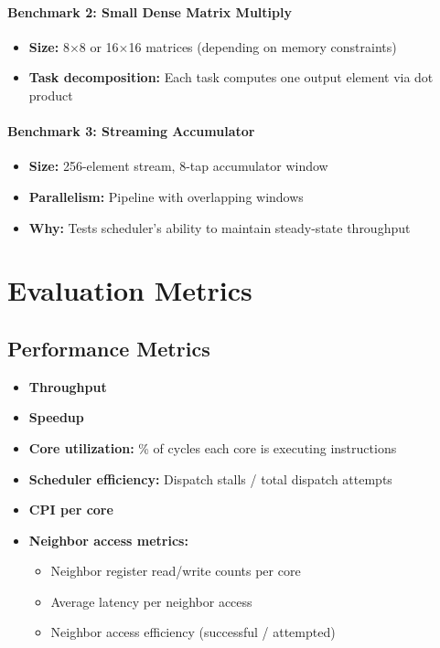 \documentclass[a4paper,12pt]{article}
\begin{document}
\paragraph{Benchmark 2: Small Dense Matrix Multiply}
\begin{itemize}
    \item \textbf{Size:} 8$\times$8 or 16$\times$16 matrices (depending on memory constraints)
    \item \textbf{Task decomposition:} Each task computes one output element via dot product
\end{itemize}

\paragraph{Benchmark 3: Streaming Accumulator}
\begin{itemize}
    \item \textbf{Size:} 256-element stream, 8-tap accumulator window
    \item \textbf{Parallelism:} Pipeline with overlapping windows
    \item \textbf{Why:} Tests scheduler's ability to maintain steady-state throughput
\end{itemize}

\section*{Evaluation Metrics}

\subsection*{Performance Metrics}
\begin{itemize}
    \item \textbf{Throughput}
    \item \textbf{Speedup} 
    \item \textbf{Core utilization:} \% of cycles each core is executing instructions
    \item \textbf{Scheduler efficiency:} Dispatch stalls / total dispatch attempts
    \item \textbf{CPI per core}
    \item \textbf{Neighbor access metrics:}
    \begin{itemize}
        \item Neighbor register read/write counts per core
        \item Average latency per neighbor access
        \item Neighbor access efficiency (successful / attempted)
    \end{itemize}
\end{itemize}
\end{document}
